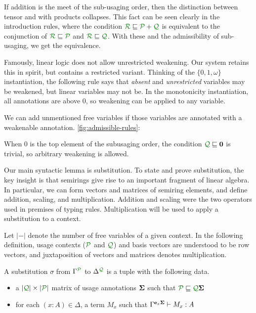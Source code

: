 If addition is the meet of the sub-usaging order, then the distinction between
tensor and with products collapses.
This fact can be seen clearly in the introduction rules, where the condition
$\resctx R \subres \resctx P + \resctx Q$ is equivalent to the conjunction of
$\resctx R \subres \resctx P$ and $\resctx R \subres \resctx Q$.
With these and the admissibility of sub-usaging, we get the equivalence.

Famously, linear logic does not allow unrestricted weakening.
Our system retains this in spirit, but contains a restricted variant.
Thinking of the $\{0,1,\omega\}$ instantiation, the following rule says that
\emph{absent} and \emph{unrestricted} variables may be weakened, but linear
variables may not be.
In the monotonicity instantiation, all annotations are above $0$, so weakening
can be applied to any variable.

\begin{lemma}[Weakening]
  \label{lem:weak}
  We can add unmentioned free variables if those variables are annotated with a
  weakenable annotation.
  \autoref{fig:admissible-rules}: 
\end{lemma}

When $0$ is the top element of the subusaging order, the condition
$\resctx Q \subres \vct 0$ is trivial, so arbitrary weakening is allowed.

Our main syntactic lemma is substitution.
To state and prove substitution, the key insight is that semirings give rise to
an important fragment of linear algebra.
In particular, we can form vectors and matrices of semiring elements, and define
addition, scaling, and multiplication.
Addition and scaling were the two operators used in premises of typing rules.
Multiplication will be used to apply a substitution to a context.


Let $|-|$ denote the number of free variables of a given context.
In the following definition, usage contexts ($\resctx P$ and $\resctx Q$) and
basis vectors are understood to be row vectors, and juxtaposition of vectors and
matrices denotes multiplication.

\begin{definition}
  A substitution $\sigma$ from $\Gamma^{\resctx P}$ to
  $\Delta^{\resctx Q}$ is a tuple with the following data.

  \begin{itemize}
  \item a $|\resctx Q| \times |\resctx P|$ matrix of usage annotations $\mathbf{\Sigma}$ such that $\resctx P \subres \resctx Q \mat \Sigma$
  \item for each $(x:A) \in \Delta$, a term $M_x$ such that
    $\Gamma^{\mathbf{e}_x \mathbf{\Sigma}} \vdash M_x : A$
  \end{itemize}
\end{definition}

